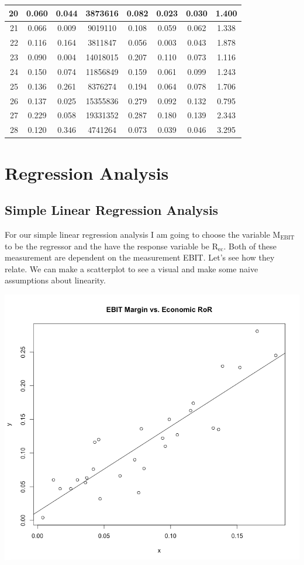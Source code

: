 \documentclass[12pt,letterpaper]{article}
\begin{document}
\begin{center}
\begin{tabular}{|r|c|c|c|c|c|c|c|}
20 & 0.060 & 0.044 & 3873616  & 0.082 & 0.023 & 0.030 & 1.400 \\ \hline
21 & 0.066 & 0.009 & 9019110  & 0.108 & 0.059 & 0.062 & 1.338 \\ \hline
22 & 0.116 & 0.164 & 3811847  & 0.056 & 0.003 & 0.043 & 1.878 \\ \hline
23 & 0.090 & 0.004 & 14018015 & 0.207 & 0.110 & 0.073 & 1.116 \\ \hline
24 & 0.150 & 0.074 & 11856849 & 0.159 & 0.061 & 0.099 & 1.243 \\ \hline
25 & 0.136 & 0.261 & 8376274  & 0.194 & 0.064 & 0.078 & 1.706 \\ \hline
26 & 0.137 & 0.025 & 15355836 & 0.279 & 0.092 & 0.132 & 0.795 \\ \hline
27 & 0.229 & 0.058 & 19331352 & 0.287 & 0.180 & 0.139 & 2.343 \\ \hline
28 & 0.120 & 0.346 & 4741264  & 0.073 & 0.039 & 0.046 & 3.295 \\ \hline
\end{tabular}
\end{center}

\section*{Regression Analysis}
\subsection*{Simple Linear Regression Analysis}

\setlength\parindent{0pt}For our simple linear regression analysis I am going to choose the variable $\text{M}_{\text{EBIT}}$ to be the regressor and the have the response variable be $\text{R}_{\text{ec}}$. Both of these measurement are dependent on the measurement EBIT. Let's see how they relate. We can make a scatterplot to see a visual and make some naive assumptions about linearity.

\begin{center}
\includegraphics[scale=0.55]{SLRplot.png}
\end{center}
\end{document}
